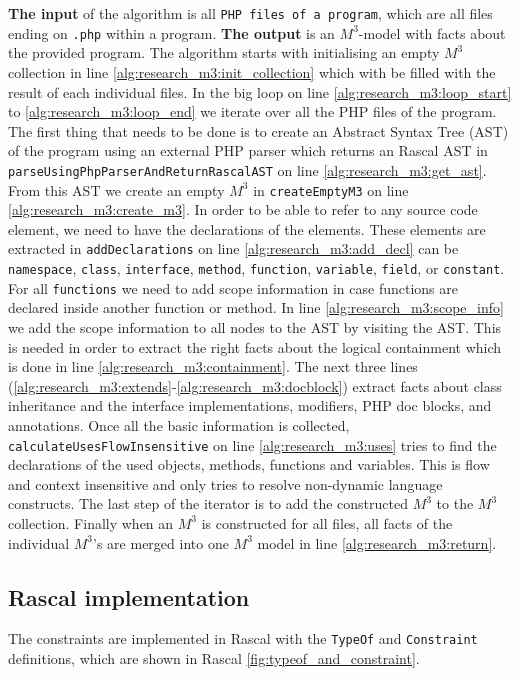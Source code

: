 \documentclass[../main.tex]{subfiles}
\begin{document}
	\textbf{The input} of the algorithm is all \texttt{PHP files of a program}, which are all files ending on \texttt{.php} within a program.
    \textbf{The output} is an $M^3$-model with facts about the provided program.
    The algorithm starts with initialising an empty $M^3$ collection in line \ref{alg:research_m3:init_collection} which with be filled with the result of each individual files.
    In the big loop on line \ref{alg:research_m3:loop_start} to \ref{alg:research_m3:loop_end} we iterate over all the PHP files of the program.
    The first thing that needs to be done is to create an \gls{Abstract Syntax Tree} (AST) of the program using an external PHP parser\footnotemark{} which returns an Rascal AST in \texttt{parseUsingPhpParserAndReturnRascalAST} on line \ref{alg:research_m3:get_ast}.
    From this AST we create an empty $M^3$ in \texttt{createEmptyM3} on line \ref{alg:research_m3:create_m3}.
    In order to be able to refer to any source code element, we need to have the declarations of the elements.
    These elements are extracted in \texttt{addDeclarations} on line \ref{alg:research_m3:add_decl} can be \texttt{namespace}, \texttt{class}, \texttt{interface}, \texttt{method},  \texttt{function}, \texttt{variable}, \texttt{field}, or \texttt{constant}.
    For all \texttt{functions} we need to add scope information in case functions are declared inside another function or method.
    In line \ref{alg:research_m3:scope_info} we add the scope information to all nodes to the AST by visiting the AST.
    This is needed in order to extract the right facts about the logical containment which is done in line \ref{alg:research_m3:containment}.
    The next three lines (\ref{alg:research_m3:extends}-\ref{alg:research_m3:docblock}) extract facts about class inheritance and the interface implementations, modifiers, PHP doc blocks, and annotations.
   	Once all the basic information is collected, \texttt{calculateUsesFlowInsensitive} on line \ref{alg:research_m3:uses} tries to find the declarations of the used objects, methods, functions and variables.
   	This is flow and context insensitive and only tries to resolve non-dynamic language constructs.
   	The last step of the iterator is to add the constructed $M^3$ to the $M^3$ collection.
   	Finally when an $M^3$ is constructed for all files, all facts of the individual $M^3$'s are merged into one $M^3$ model in line \ref{alg:research_m3:return}. 
       \subsection{Rascal implementation}
    The constraints are implemented in Rascal with the \texttt{TypeOf} and \texttt{Constraint} definitions, which are shown in Rascal \ref{fig:typeof_and_constraint}.
    
\end{document}
